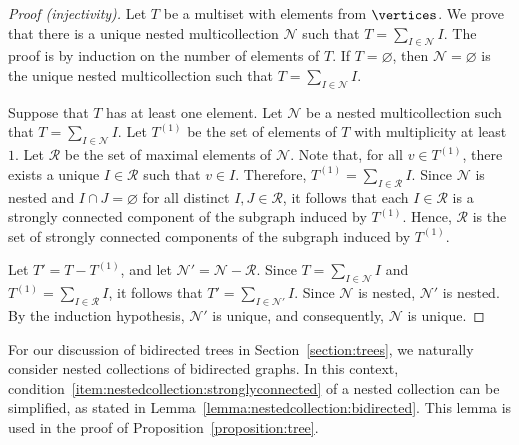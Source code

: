 \begin{proof}[Proof (injectivity)]
    Let \(T\) be a multiset with elements from \(\vertices\). We prove that there is a unique nested multicollection \(\mathcal{N}\) such that \(T = \sum_{I \in \mathcal{N}} I\).
    The proof is by induction on the number of elements of \(T\).
    If \(T = \varnothing\), then \(\mathcal{N} = \varnothing\) is the unique nested multicollection such that \(T = \sum_{I \in \mathcal{N}} I\).

    Suppose that \(T\) has at least one element.
    Let \(\mathcal{N}\) be a nested multicollection such that \(T = \sum_{I \in \mathcal{N}} I\).
    Let \(T^{(1)}\) be the set of elements of \(T\) with multiplicity at least \(1\).
    Let \(\mathcal{R}\) be the set of maximal elements of \(\mathcal{N}\).
    Note that, for all \(v \in T^{(1)}\), there exists a unique \(I \in \mathcal{R}\) such that \(v \in I\).
    Therefore, \(T^{(1)} = \sum_{I \in \mathcal{R}} I\).
    Since \(\mathcal{N}\) is nested and \(I \cap J = \varnothing\) for all distinct \(I, J \in \mathcal{R}\), it follows that each \(I \in \mathcal{R}\) is a strongly connected component of the subgraph induced by \(T^{(1)}\).
    Hence, \(\mathcal{R}\) is the set of strongly connected components of the subgraph induced by \(T^{(1)}\).

    Let \(T' = T - T^{(1)}\), and let \(\mathcal{N}' = \mathcal{N} - \mathcal{R}\).
    Since \(T = \sum_{I \in \mathcal{N}} I\) and \(T^{(1)} = \sum_{I \in \mathcal{R}} I\),
    it follows that \(T' = \sum_{I \in \mathcal{N}'} I\).
    Since \(\mathcal{N}\) is nested, \(\mathcal{N}'\) is nested.
    By the induction hypothesis, \(\mathcal{N}'\) is unique, and consequently, \(\mathcal{N}\) is unique.
\end{proof}

For our discussion of bidirected trees in Section~\ref{section:trees},
we naturally consider nested collections of bidirected graphs.
In this context, condition~\ref{item:nestedcollection:stronglyconnected} of a nested collection can be simplified,
as stated in Lemma~\ref{lemma:nestedcollection:bidirected}.
This lemma is used in the proof of Proposition~\ref{proposition:tree}.

